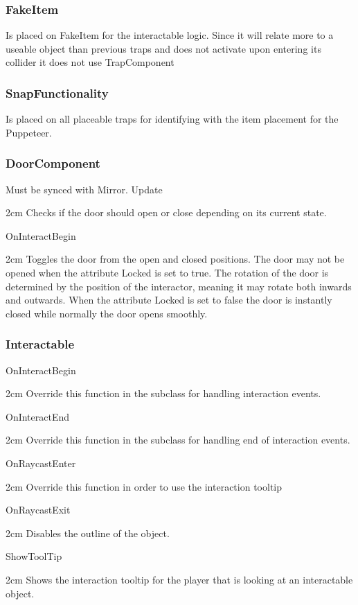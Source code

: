 \documentclass[11pt]{article}
\newenvironment{indentall}{\begin{adjustwidth}{2cm}{}}{\end{adjustwidth}}
\begin{document}
\subsubsection{FakeItem}
Is placed on FakeItem for the interactable logic. Since it will relate more to a useable object than previous traps and does not activate upon entering its collider it does not use TrapComponent

\subsubsection{SnapFunctionality}
Is placed on all placeable traps for identifying with the item placement for the Puppeteer.

\newpage

\subsubsection{DoorComponent}
Must be synced with Mirror.
\newline
\newline Update
\begin{indentall}
Checks if the door should open or close depending on its current state.
\end{indentall}
OnInteractBegin
\begin{indentall}
Toggles the door from the open and closed positions. The door may not be opened when the attribute Locked is set to true. The rotation of the door is determined by the position of the interactor, meaning it may rotate both inwards and outwards. When the attribute Locked is set to false the door is instantly closed while normally the door opens smoothly.
\end{indentall}

\subsubsection{Interactable}
OnInteractBegin
\begin{indentall}
Override this function in the subclass for handling interaction events.
\end{indentall}
OnInteractEnd
\begin{indentall}
Override this function in the subclass for handling end of interaction events.
\end{indentall}
OnRaycastEnter
\begin{indentall}
Override this function in order to use the interaction tooltip
\end{indentall}
OnRaycastExit
\begin{indentall}
Disables the outline of the object.
\end{indentall}
ShowToolTip
\begin{indentall}
Shows the interaction tooltip for the player that is looking at an interactable object.
\end{indentall}
\end{document}

